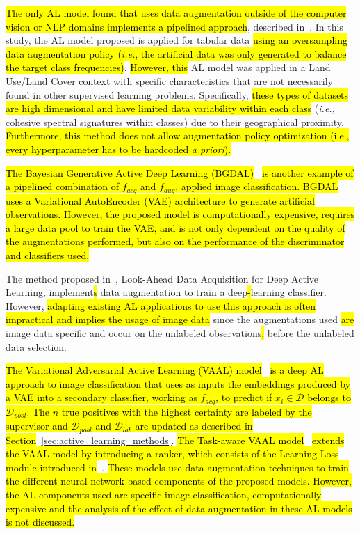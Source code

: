 \documentclass[preprint, 12pt]{elsarticle}
\begin{document}
\hl{The only AL model found that uses data augmentation outside of the
computer vision or NLP domains implements a pipelined approach}, described
in~\cite{Fonseca2021}. In this study, the AL model proposed is applied for
tabular data \hl{using an oversampling data augmentation policy
(\textit{i.e.}, the artificial data was only generated to balance the target
class frequencies)}. \hl{However, this} AL model was applied in a Land
Use/Land Cover context with specific characteristics that are not necessarily
found in other supervised learning problems. Specifically, \hl{these types of
datasets are high dimensional and have limited data variability within each
class} (\textit{i.e.,} cohesive spectral signatures within classes) due to
their geographical proximity. \hl{Furthermore, this method does not allow
augmentation policy optimization (i.e., every hyperparameter has to be
hardcoded \textit{a priori}).}

\hl{The Bayesian Generative Active Deep Learning
(BGDAL)}~\cite{tran2019bayesian} \hl{is another example of a pipelined
combination of $f_{acq}$ and $f_{aug}$, applied image classification. BGDAL
uses a Variational AutoEncoder (VAE) architecture to generate artificial
observations. However, the proposed model is computationally expensive,
requires a large data pool to train the VAE, and is not only dependent on the
quality of the augmentations performed, but also on the performance of the
discriminator and classifiers used.}

The method proposed in~\cite{Kim2021}, Look-Ahead Data Acquisition for Deep
Active Learning, implement\hl{s} data augmentation to train a deep\hl{-}learning
classifier. However, \hl{adapting existing AL applications to use this
approach is often impractical and implies the usage of image data} since the
augmentations used \hl{are} image data specific and occur on the unlabeled
observations\hl{,} before the unlabeled data selection.

\hl{The Variational Adversarial Active Learning (VAAL)
model}~\cite{sinha2019variational} \hl{is a deep AL approach to image
classification that uses as inputs the embeddings produced by a VAE into a
secondary classifier, working as $f_{acq}$, to predict if $x_i \in
\mathcal{D}$ belongs to $\mathcal{D}_{pool}$. The $n$ true positives with the
highest certainty are labeled by the supervisor and $\mathcal{D}_{pool}$ and
$\mathcal{D}_{lab}$ are updated as described in
Section}~\ref{sec:active_learning_methods}. \hl{The Task-aware VAAL
model}~\cite{kim2021task} \hl{extends the VAAL model by introducing a ranker,
which consists of the Learning Loss module introduced in}~\cite{Yoo2019}.
\hl{These models use data augmentation techniques to train the different
neural network-based components of the proposed models. However, the AL
components used are specific image classification, computationally expensive
and the analysis of the effect of data augmentation in these AL models is not
discussed.}
\end{document}
